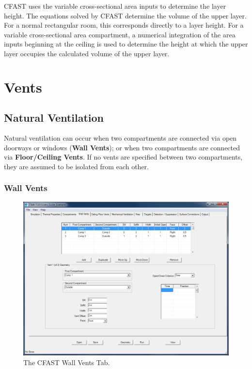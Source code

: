 CFAST uses the variable cross-sectional area inputs to determine the layer height. The equations solved by CFAST determine the volume of the upper layer. For a normal rectangular room, this corresponds directly to a layer height. For a variable cross-sectional area compartment, a numerical integration of the area inputs beginning at the ceiling is used to determine the height at which the upper layer occupies the calculated volume of the upper layer.





\chapter{Vents}
\section{Natural Ventilation}

Natural ventilation can occur when two compartments are connected via open doorways or windows (\textbf{Wall Vents}); or when two compartments are connected via \textbf{Floor/Ceiling Vents}. If no vents are specified between two compartments, they are assumed to be isolated from each other.




\subsection{Wall Vents}
\label{info:VENT}
\begin{figure}[h!]
\begin{center}
\includegraphics[width=6.5in]{FIGURES/Natural_Flow_Tab}
\caption[The CFAST Wall Vents Tab]{The CFAST Wall Vents Tab.}
\end{center}
\end{figure}

